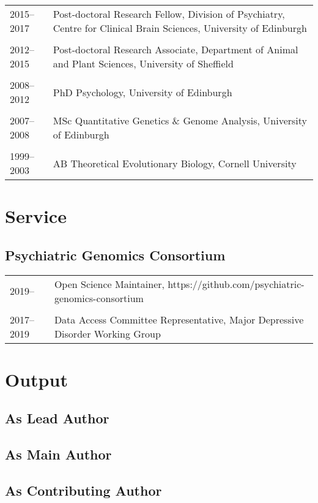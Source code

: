 \documentclass[11pt]{article}
\begin{document}
\begin{tabular}{p{3cm}p{12cm}}
2015--2017 & Post-doctoral Research Fellow, Division of Psychiatry, Centre for Clinical Brain Sciences, University of Edinburgh \\ \\

2012--2015 & Post-doctoral Research Associate, Department of Animal and Plant Sciences, University of Sheffield \\ \\

2008--2012 & PhD Psychology, University of Edinburgh \\ \\

2007--2008 & MSc Quantitative Genetics \& Genome Analysis, University of Edinburgh \\ \\

1999–2003 & AB Theoretical Evolutionary Biology, Cornell University

\end{tabular}

\section*{Service}

\subsection*{Psychiatric Genomics Consortium}

\begin{tabular}{p{3cm}p{12cm}}
2019-- & Open Science Maintainer, https://github.com/psychiatric-genomics-consortium \\ \\

2017--2019 & Data Access Committee Representative, Major Depressive Disorder Working Group 

\end{tabular}


\section*{Output}

\subsection*{As Lead Author}

\nocite{*}

\setlength\bibhang{0pt}

\printbibliography[type=article,keyword=lead,heading=none]

\subsection*{As Main Author}

\printbibliography[type=article,keyword=main,heading=none]

\subsection*{As Contributing Author}

\printbibliography[type=article,keyword=contrib,heading=none]
\end{document}
